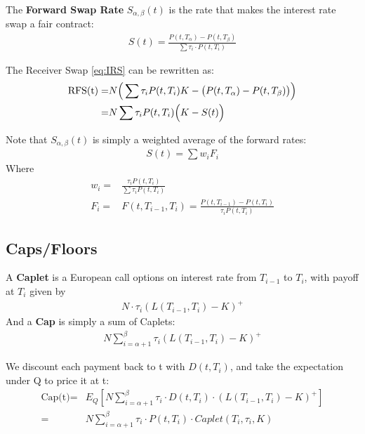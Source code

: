 \begin{definition}
    The \textbf{Forward Swap Rate} $S_{\alpha, \beta}(t)$ is the rate that makes the interest rate swap a fair contract:
    \begin{align*}
        S(t) = \frac{P(t, T_{\alpha}) - P(t, T_{\beta})}{\sum \tau_i \cdot P(t, T_i)}
    \end{align*}
\end{definition}

The Receiver Swap \eqref{eq:IRS} can be rewritten as:
\begin{align*}
    \text{RFS(t)} =& N \Big( \sum \tau_i P(t, T_i)  K - \big(P(t, T_{\alpha}) - P(t, T_{\beta})\big) \Big) \notag \\
    =& N  \sum \tau_i P(t, T_i) \Big( K - S(t) \Big)
\end{align*}

\begin{remark}
    Note that $S_{\alpha, \beta}(t)$ is simply a weighted average of the forward rates:
    \begin{align*}
        S(t) = \sum w_i F_i
    \end{align*}
    Where 
    \begin{align*}
        w_i =& \frac{\tau_i P(t, T_i)}{\sum \tau_i P(t, T_i)} \\
        F_i =& F(t, T_{i-1}, T_i) = \frac{P(t, T_{i-1}) - P(t, T_i)}{\tau_iP(t, T_i)}
    \end{align*}
    
\end{remark}


\subsection{Caps/Floors}
\begin{definition}
    A \textbf{Caplet} is a European call options on interest rate from $T_{i-1}$ to $T_i$, with payoff at $T_i$ given by
    \begin{align*}
        N \cdot \tau_i \left( L(T_{i-1}, T_i) - K \right)^+
    \end{align*}
    And a \textbf{Cap} is simply a sum of Caplets:
    \begin{align*}
        N \sum_{i = \alpha + 1}^{\beta} \tau_i \left( L(T_{i-1}, T_i) - K \right)^+
    \end{align*}
    
    We discount each payment back to t with  $D(t, T_i)$, and take the expectation under Q to price it at t:
    \begin{align}
        \text{Cap(t)} =& E_Q\left[ N \sum_{i = \alpha + 1}^{\beta} \tau_i \cdot D(t, T_i) \cdot \left( L(T_{i-1}, T_i) - K \right)^+ \right]  \\
        =& N \sum_{i = \alpha + 1}^{\beta} \tau_i \cdot P(t, T_i) \cdot Caplet(T_i, \tau_i, K)
    \end{align}
\end{definition}

